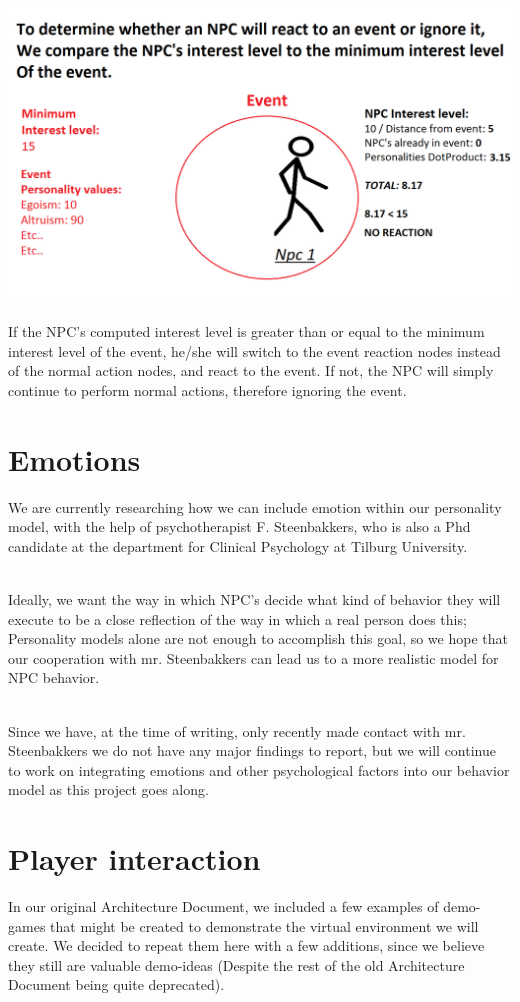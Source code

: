 \documentclass[11pt]{article} %
\begin{document}
~\\
\includegraphics[scale=0.4]{InterestLevel}
~\\
 If the NPC's computed interest level is greater than or equal to the minimum interest level of the event, he/she will switch to the event reaction nodes instead of the normal action nodes, and react to the event. If not, the NPC will simply continue to perform normal actions, therefore ignoring the event.


\newpage
\section{Emotions}
We are currently researching how we can include emotion within our personality model, with the help of psychotherapist F. Steenbakkers, who is also a Phd candidate at the department for Clinical Psychology at Tilburg University. 

~\\
Ideally, we want the way in which NPC's decide what kind of behavior they will execute to be a close reflection of the way in which a real person does this; Personality models alone are not enough to accomplish this goal, so we hope that our cooperation with mr. Steenbakkers can lead us to a more realistic model for NPC behavior. 

~\\
Since we have, at the time of writing, only recently made contact with mr. Steenbakkers we do not have any major findings to report, but we will continue to work on integrating emotions and other psychological factors into our behavior model as this project goes along.

\newpage
\section{Player interaction}
In our original Architecture Document, we included a few examples of demo-games that might be created to demonstrate the virtual environment we will create. We decided to repeat them here with a few additions, since we believe they still are valuable demo-ideas (Despite the rest of the old Architecture Document being quite deprecated).
\end{document}
